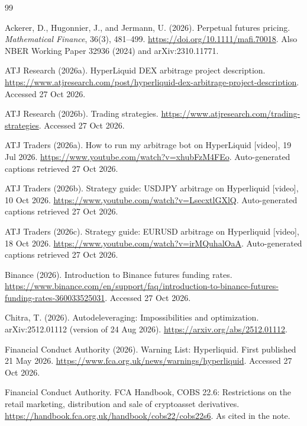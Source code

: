 \documentclass[11pt,a4paper]{article}
\begin{document}
\begin{thebibliography}{99}
\setlength{\itemsep}{2pt}\small

Ackerer, D., Hugonnier, J., and Jermann, U. (2026). Perpetual futures pricing. \emph{Mathematical Finance}, 36(3), 481--499. \url{https://doi.org/10.1111/mafi.70018}. Also NBER Working Paper 32936 (2024) and arXiv:2310.11771.

ATJ Research (2026a). HyperLiquid DEX arbitrage project description. \url{https://www.atjresearch.com/post/hyperliquid-dex-arbitrage-project-description}. Accessed 27 Oct 2026.

ATJ Research (2026b). Trading strategies. \url{https://www.atjresearch.com/trading-strategies}. Accessed 27 Oct 2026.

ATJ Traders (2026a). How to run my arbitrage bot on HyperLiquid [video], 19 Jul 2026. \url{https://www.youtube.com/watch?v=xhubFzM4FEo}. Auto-generated captions retrieved 27 Oct 2026.

ATJ Traders (2026b). Strategy guide: USDJPY arbitrage on Hyperliquid [video], 10 Oct 2026. \url{https://www.youtube.com/watch?v=LsecxtlGXlQ}. Auto-generated captions retrieved 27 Oct 2026.

ATJ Traders (2026c). Strategy guide: EURUSD arbitrage on Hyperliquid [video], 18 Oct 2026. \url{https://www.youtube.com/watch?v=irMQuhalOaA}. Auto-generated captions retrieved 27 Oct 2026.

Binance (2026). Introduction to Binance futures funding rates. \url{https://www.binance.com/en/support/faq/introduction-to-binance-futures-funding-rates-360033525031}. Accessed 27 Oct 2026.

Chitra, T. (2026). Autodeleveraging: Impossibilities and optimization. arXiv:2512.01112 (version of 24 Aug 2026). \url{https://arxiv.org/abs/2512.01112}.

Financial Conduct Authority (2026). Warning List: Hyperliquid. First published 21 May 2026. \url{https://www.fca.org.uk/news/warnings/hyperliquid}. Accessed 27 Oct 2026.

Financial Conduct Authority. FCA Handbook, COBS 22.6: Restrictions on the retail marketing, distribution and sale of cryptoasset derivatives. \url{https://handbook.fca.org.uk/handbook/cobs22/cobs22s6}. As cited in the note.


\end{thebibliography}
\end{document}
